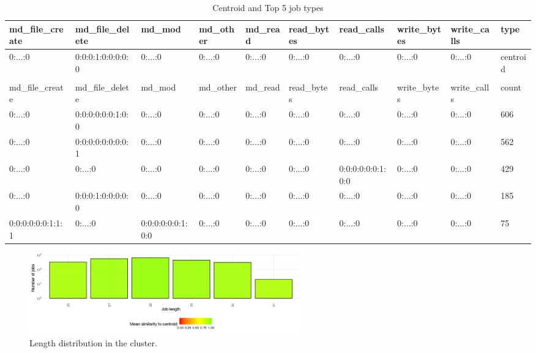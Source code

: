 \documentclass[]{llncs}
\begin{document}
\begin{table}
  \centering
  \begin{tabular}{@{ }l@{ }@{ }l@{ }@{ }l@{ }@{ }l@{ }@{ }l@{ }@{ }l@{ }@{ }l@{ }@{ }l@{ }@{ }l@{ }@{ }l@{ }}
    md\_file\_create  & md\_file\_delete  & md\_mod           & md\_other & md\_read & read\_bytes & read\_calls       & write\_bytes & write\_calls & type     \\ 
    \hline
    0:...:0           & 0:0:0:1:0:0:0:0:0 & 0:...:0           & 0:...:0   & 0:...:0  & 0:...:0     & 0:...:0           & 0:...:0      & 0:...:0      & centroid \\ 
    &                   &                   &           &          &             &                   &              &              &          \\ 
    md\_file\_create  & md\_file\_delete  & md\_mod           & md\_other & md\_read & read\_bytes & read\_calls       & write\_bytes & write\_calls & count    \\ 
    \hline
    0:...:0           & 0:0:0:0:0:0:1:0:0 & 0:...:0           & 0:...:0   & 0:...:0  & 0:...:0     & 0:...:0           & 0:...:0      & 0:...:0      & 606      \\ 
    0:...:0           & 0:0:0:0:0:0:0:0:1 & 0:...:0           & 0:...:0   & 0:...:0  & 0:...:0     & 0:...:0           & 0:...:0      & 0:...:0      & 562      \\ 
    0:...:0           & 0:...:0           & 0:...:0           & 0:...:0   & 0:...:0  & 0:...:0     & 0:0:0:0:0:0:1:0:0 & 0:...:0      & 0:...:0      & 429      \\ 
    0:...:0           & 0:0:0:1:0:0:0:0:0 & 0:...:0           & 0:...:0   & 0:...:0  & 0:...:0     & 0:...:0           & 0:...:0      & 0:...:0      & 185      \\ 
    0:0:0:0:0:0:1:1:1 & 0:...:0           & 0:0:0:0:0:0:1:0:0 & 0:...:0   & 0:...:0  & 0:...:0     & 0:...:0           & 0:...:0      & 0:...:0      & 75       \\ 
  \end{tabular}
  \caption{Centroid and Top 5 job types}
  \label{tab:hex_lev:top_jobs}
\end{table}


\begin{figure}
  \centering
  \includegraphics[width=4.61in,height=1.39in]{./media/image5.png}
  \caption{Length distribution in the cluster.}
  \label{fig:hex_lev:length}
\end{figure}
\end{document}
